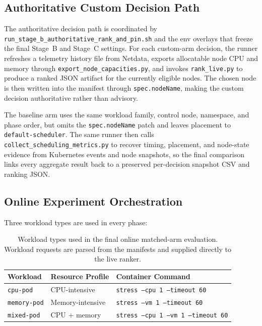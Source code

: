 \subsection{Authoritative Custom Decision Path}

The authoritative decision path is coordinated by \texttt{run\_stage\_b\_authoritative\_rank\_and\_pin.sh} and the env overlays that freeze the final Stage~B and Stage~C settings. For each custom-arm decision, the runner refreshes a telemetry history file from Netdata, exports allocatable node CPU and memory through \texttt{export\_node\_capacities.py}, and invokes \texttt{rank\_live.py} to produce a ranked JSON artifact for the currently eligible nodes. The chosen node is then written into the manifest through \texttt{spec.nodeName}, making the custom decision authoritative rather than advisory.

The baseline arm uses the same workload family, control node, namespace, and phase order, but omits the \texttt{spec.nodeName} patch and leaves placement to \texttt{default-scheduler}. The same runner then calls \texttt{collect\_scheduling\_metrics.py} to recover timing, placement, and node-state evidence from Kubernetes events and node snapshots, so the final comparison links every aggregate result back to a preserved per-decision snapshot CSV and ranking JSON.

\subsection{Online Experiment Orchestration}

Three workload types are used in every phase:

\begin{table}[h]
\centering
\begin{tabular}{lll}
\hline
\textbf{Workload} & \textbf{Resource Profile} & \textbf{Container Command} \\
\hline
\texttt{cpu-pod} & CPU-intensive & \texttt{stress --cpu 1 --timeout 60} \\
\texttt{memory-pod} & Memory-intensive & \texttt{stress --vm 1 --timeout 60} \\
\texttt{mixed-pod} & CPU + memory & \texttt{stress --cpu 1 --vm 1 --timeout 60} \\
\hline
\end{tabular}
\caption{Workload types used in the final online matched-arm evaluation. Workload requests are parsed from the manifests and supplied directly to the live ranker.}
\label{tab:ch3-workload-types}
\end{table}

